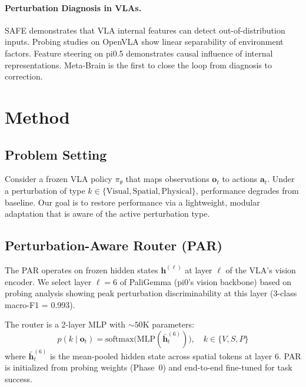 \documentclass[letterpaper]{article}
\begin{document}
\paragraph{Perturbation Diagnosis in VLAs.}
SAFE demonstrates that VLA internal features can detect out-of-distribution inputs.
Probing studies on OpenVLA show linear separability of environment factors.
Feature steering on pi0.5 demonstrates causal influence of internal representations.
Meta-Brain is the first to close the loop from diagnosis to correction.

\section{Method}

\subsection{Problem Setting}

Consider a frozen VLA policy $\pi_\theta$ that maps observations $\mathbf{o}_t$ to actions $\mathbf{a}_t$.
Under a perturbation of type $k \in \{\text{Visual}, \text{Spatial}, \text{Physical}\}$, performance degrades from baseline.
Our goal is to restore performance via a lightweight, modular adaptation that is aware of the active perturbation type.

\subsection{Perturbation-Aware Router (PAR)}

The PAR operates on frozen hidden states $\mathbf{h}^{(\ell)}$ at layer $\ell$ of the VLA's vision encoder.
We select layer $\ell=6$ of PaliGemma (pi0's vision backbone) based on probing analysis showing peak perturbation discriminability at this layer (3-class macro-F1 = 0.993).

The router is a 2-layer MLP with ${\sim}50$K parameters:
\begin{equation}
  p(k \mid \mathbf{o}_t) = \text{softmax}\!\bigl(\text{MLP}(\bar{\mathbf{h}}^{(6)}_t)\bigr), \quad k \in \{V, S, P\}
\end{equation}
where $\bar{\mathbf{h}}^{(6)}_t$ is the mean-pooled hidden state across spatial tokens at layer 6.
PAR is initialized from probing weights (Phase~0) and end-to-end fine-tuned for task success.
\end{document}
